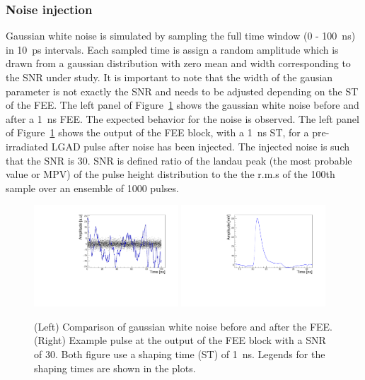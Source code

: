 \documentclass[preprint,1p]{elsarticle}
\begin{document}



\subsubsection{Noise injection}\label{sec:noise_simulation}
Gaussian white noise is simulated by sampling the full time window (0 - 100~\si{ns}) in 10~\si{ps} intervals. Each
sampled time is assign a random amplitude which is drawn from a gaussian distribution with zero mean and width corresponding to the SNR
under study. It is important to note that the width of the gausian parameter is not exactly the SNR and needs to be adjusted depending
on the ST of the FEE. The left panel of Figure~\ref{fig:noise} shows the gaussian white noise before and after a 1~\si{ns} FEE.
The expected behavior for the noise is observed. The left panel of Figure~\ref{fig:noise} shows the output of the
FEE block, with a 1~\si{ns} ST, for a pre-irradiated LGAD pulse after noise has been injected. The injected noise is
such that the SNR is 30. SNR is defined ratio of the landau peak (the most probable value or MPV) of the pulse height distribution to the
the r.m.s of the 100th sample over an ensemble of 1000 pulses.

\begin{figure}[htbp]
  \centering
  \includegraphics[width=0.48\textwidth]{figs/noise_vs_shaped_noise.pdf} \hfill
  \includegraphics[width=0.48\textwidth]{figs/lgad_pre_rad_st_1ns_snr_30.pdf}
  \caption{(Left) Comparison of gaussian white noise before and after the FEE.
  (Right) Example pulse at the output of the FEE block with a SNR of 30. Both figure use a shaping time (ST) of 1~\si{ns}. Legends for the shaping times are shown in the plots.}
  \label{fig:noise}
\end{figure}
\end{document}
